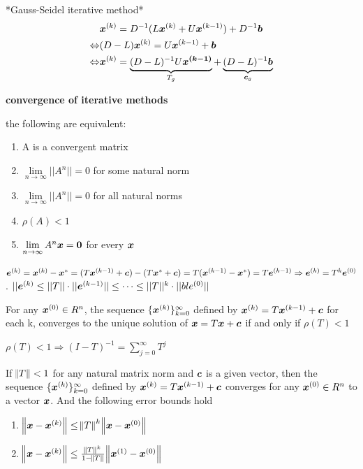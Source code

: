 \documentclass[11pt]{article}
\begin{document}
    *Gauss-Seidel iterative method*
    \begin{align*}
      &\boldsymbol{x}^{(k)}=D^{-1}(L\boldsymbol{x}^{(k)}+U\boldsymbol{x}^{(k-1)})+D^{-1}\boldsymbol{b}\\
      \Leftrightarrow&(D-L)\boldsymbol{x}^{(k)}=U\boldsymbol{x}^{(k-1)}+\boldsymbol{b}\\
      \Leftrightarrow&\boldsymbol{x}^{(k)}=\underbrace{(D-L)^{-1}U\boldsymbol{x^{(k-1)}}}_{T_g}
                       +\underbrace{(D-L)^{-1}\boldsymbol{b}}_{\boldsymbol{c}_g}
    \end{align*}


    \textbf{convergence of iterative methods}
    \begin{theorem}
      the following are equivalent:
      \begin{enumerate}
      \item A is a convergent matrix
      \item $\lim\limits_{n\to\infty}||A^n|| = 0$ for some natural norm
      \item $\lim\limits_{n\to\infty}||A^n||=0$ for all natural norms
      \item $\rho(A)<1$
      \item $\lim\limits_{n\to\infty}A^n\boldsymbol{x}=\boldsymbol{0}$ for every $\boldsymbol{x}$
      \end{enumerate}
    \end{theorem}

    \(\boldsymbol{e}^{(k)}=\boldsymbol{x}^{(k)}-\boldsymbol{x}^*=(T\boldsymbol{x}^{(k-1)}+\boldsymbol{c})-(T\boldsymbol{x}^*+\boldsymbol{c})
    =T(\boldsymbol{x}^{(k-1)}-\boldsymbol{x}^*)=T\boldsymbol{e}^{(k-1)}\Rightarrow\boldsymbol{e}^{(k)}=T^k\boldsymbol{e}^{(0)}\).
    \(||\boldsymbol{e}^{(k)}\le||T||\cdot||\boldsymbol{e}^{(k-1)}||\le\dots\le||T||^k\cdot||bl{e}^{(0)}||\)

    \begin{theorem}
      For any $\boldsymbol{x}^{(0)}\in R^n$, the sequence $\{\boldsymbol{x}^{(k)}\}_{k=0}^\infty$
      defined by $\boldsymbol{x}^{(k)}=T\boldsymbol{x}^{(k-1)}+\boldsymbol{c}$ for each k, converges to the
      unique solution of $\boldsymbol{x}=T\boldsymbol{x}+\boldsymbol{c}$ if and only if $\rho(T)<1$
    \end{theorem}
    \(\rho(T)<1\Longrightarrow(I-T)^{-1}=\displaystyle\sum_{j=0}^\infty T^j\)

    \begin{theorem}
      If $\norm{T}<1$ for any natural matrix norm and $\boldsymbol{c}$ is a given vector, then the
      sequence $\{\boldsymbol{x}^{(k)}\}_{k=0}^\infty$ defined by $\boldsymbol{x}^{(k)}=T\boldsymbol{x}^{(k-1)}+\boldsymbol{c}$
      converges for any $\boldsymbol{x}^{(0)}\in R^n$ to a vector $\boldsymbol{x}$. And the following
      error bounds hold
      \begin{enumerate}
      \item $\norm{\boldsymbol{x}-\boldsymbol{x}^{(k)}}\le\norm{T}^k\norm{\boldsymbol{x}-\boldsymbol{x}^{(0)}}$
      \item $\norm{\boldsymbol{x}-\boldsymbol{x}^{(k)}}\le\frac{\norm{T}^k}{1-\norm{T}}\norm{\boldsymbol{x}^{(1)}
          -\boldsymbol{x}^{(0)}}$
      \end{enumerate}
    \end{theorem}
\end{document}
